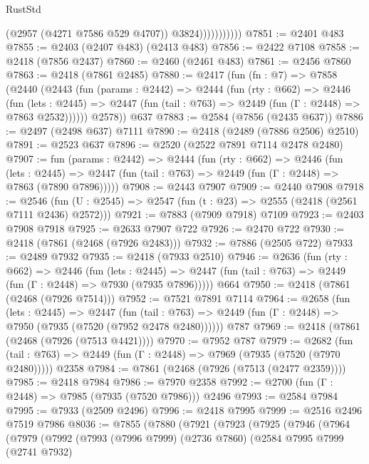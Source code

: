 \begin{lexlean}{RustStd}
\begin{coremodule}
                          (@2957 (@4271 @7586 @529 @4707))
                          @3824)))))))))))
@7851 := @2401 @483
@7855 := @2403 (@2407 @483) (@2413 @483)
@7856 := @2422 @7108
@7858 := @2418 (@7856 @2437)
@7860 := @2460 (@2461 @483)
@7861 := @2456 @7860
@7863 := @2418 (@7861 @2485)
@7880 := @2417
    (fun (fn : @7) =>
    @7858
      (@2440
        (@2443
          (fun (params : @2442) =>
          @2444
            (fun (rty : @662) =>
            @2446
              (fun (lets : @2445) =>
              @2447 (fun (tail : @763) => @2449 (fun (Γ : @2448) => @7863 @2532))))))
        @2578))
    @637
@7883 := @2584 (@7856 (@2435 @637))
@7886 := @2497 (@2498 @637) @7111
@7890 := @2418 (@2489 (@7886 @2506) @2510)
@7891 := @2523 @637
@7896 := @2520 (@2522 @7891 @7114 @2478 @2480)
@7907 := fun (params : @2442) =>
  @2444
    (fun (rty : @662) =>
    @2446
      (fun (lets : @2445) =>
      @2447 (fun (tail : @763) => @2449 (fun (Γ : @2448) => @7863 (@7890 @7896)))))
@7908 := @2443 @7907
@7909 := @2440 @7908
@7918 := @2546 (fun (U : @2545) => @2547 (fun (t : @23) => @2555 (@2418 (@2561 @7111 @2436) @2572)))
@7921 := @7883 (@7909 @7918) @7109
@7923 := @2403 @7908 @7918
@7925 := @2633 @7907 @722
@7926 := @2470 @722
@7930 := @2418 (@7861 (@2468 (@7926 @2483)))
@7932 := @7886 (@2505 @722)
@7933 := @2489 @7932
@7935 := @2418 (@7933 @2510)
@7946 := @2636
    (fun (rty : @662) =>
    @2446
      (fun (lets : @2445) =>
      @2447 (fun (tail : @763) => @2449 (fun (Γ : @2448) => @7930 (@7935 @7896)))))
    @664
@7950 := @2418 (@7861 (@2468 (@7926 @7514)))
@7952 := @7521 @7891 @7114
@7964 := @2658
    (fun (lets : @2445) =>
    @2447
      (fun (tail : @763) => @2449 (fun (Γ : @2448) => @7950 (@7935 (@7520 (@7952 @2478 @2480))))))
    @787
@7969 := @2418 (@7861 (@2468 (@7926 (@7513 @4421))))
@7970 := @7952 @787
@7979 := @2682
    (fun (tail : @763) => @2449 (fun (Γ : @2448) => @7969 (@7935 (@7520 (@7970 @2480)))))
    @2358
@7984 := @7861 (@2468 (@7926 (@7513 (@2477 @2359))))
@7985 := @2418 @7984
@7986 := @7970 @2358
@7992 := @2700 (fun (Γ : @2448) => @7985 (@7935 (@7520 @7986))) @2496
@7993 := @2584 @7984
@7995 := @7933 (@2509 @2496)
@7996 := @2418 @7995
@7999 := @2516 @2496 @7519 @7986
@8036 := @7855
    (@7880
      (@7921
        (@7923
          (@7925
            (@7946
              (@7964
                (@7979
                  (@7992
                    (@7993
                      (@7996 @7999)
                      (@2736 @7860)
                      (@2584
                        @7995
                        @7999
                        (@2741 @7932)

\end{coremodule}
\end{lexlean}
